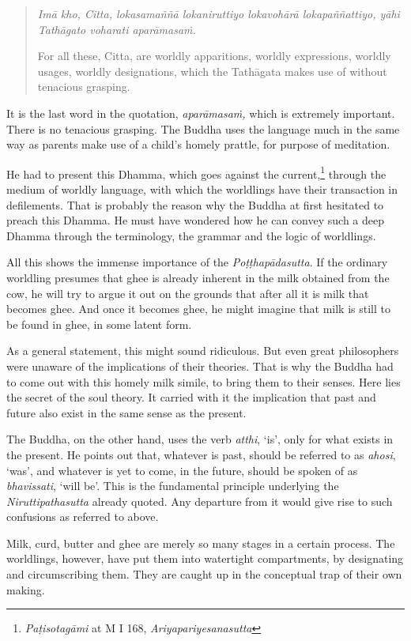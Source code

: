 \begin{quote}
\emph{Imā kho, Citta, lokasamaññā lokaniruttiyo lokavohārā lokapaññattiyo, yāhi Tathāgato voharati aparāmasaṁ.}

For all these, Citta, are worldly apparitions, worldly expressions, worldly usages, worldly designations, which the Tathāgata makes use of without tenacious grasping.
\end{quote}

It is the last word in the quotation, \emph{aparāmasaṁ,} which is extremely important. There is no tenacious grasping. The Buddha uses the language much in the same way as parents make use of a child's homely prattle, for purpose of meditation.

He had to present this Dhamma, which goes against the current,\footnote{\emph{Paṭisotagāmi} at M I 168, \emph{Ariyapariyesanasutta}} through the medium of worldly language, with which the worldlings have their transaction in defilements. That is probably the reason why the Buddha at first hesitated to preach this Dhamma. He must have wondered how he can convey such a deep Dhamma through the terminology, the grammar and the logic of worldlings.

All this shows the immense importance of the \emph{Poṭṭhapādasutta}. If the ordinary worldling presumes that ghee is already inherent in the milk obtained from the cow, he will try to argue it out on the grounds that after all it is milk that becomes ghee. And once it becomes ghee, he might imagine that milk is still to be found in ghee, in some latent form.

As a general statement, this might sound ridiculous. But even great philosophers were unaware of the implications of their theories. That is why the Buddha had to come out with this homely milk simile, to bring them to their senses. Here lies the secret of the soul theory. It carried with it the implication that past and future also exist in the same sense as the present.

The Buddha, on the other hand, uses the verb \emph{atthi}, `is', only for what exists in the present. He points out that, whatever is past, should be referred to as \emph{ahosi}, `was', and whatever is yet to come, in the future, should be spoken of as \emph{bhavissati}, `will be'. This is the fundamental principle underlying the \emph{Niruttipathasutta} already quoted. Any departure from it would give rise to such confusions as referred to above.

Milk, curd, butter and ghee are merely so many stages in a certain process. The worldlings, however, have put them into watertight compartments, by designating and circumscribing them. They are caught up in the conceptual trap of their own making.

